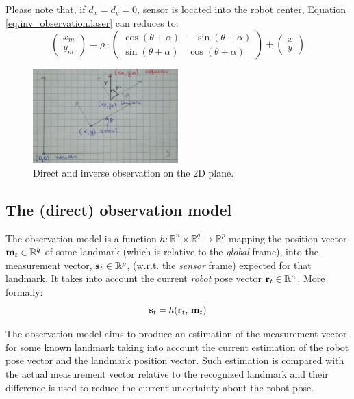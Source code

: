 		Please note that, if $d_x = d_y = 0$, \ie{} sensor is located into the robot center, Equation \ref{eq.inv_observation.laser} can reduces to:
		\[
			\left(\begin{array}{c}
				x_m \\ y_m
			\end{array}\right)
			=
			\rho \cdot
			\left(\begin{array}{ccc}
				\cos{(\theta + \alpha)} & -\sin{(\theta + \alpha)} \\
				\sin{(\theta + \alpha)} & \cos{(\theta + \alpha)}
			\end{array}\right)
			+
			\left(\begin{array}{c}
				x \\ y
			\end{array}\right)
		\]
		
		\begin{figure}
			\centering
			\includegraphics[width=0.5\textwidth]{./img/observation.png}
			\caption{Direct and inverse observation on the 2D plane.}
			\label{fig.observation}
		\end{figure}
		
\subsection{The (direct) observation model}
	The observation model is a function $h : \mathbb{R}^n \times \mathbb{R}^q \rightarrow \mathbb{R}^p$ mapping the position vector $\boldsymbol{\mathrm{{m}}}_t \in \mathbb{R}^q$ of some landmark (which is relative to the \emph{global} frame), into the measurement vector, $\boldsymbol{\mathrm{{s}}}_{t} \in \mathbb{R}^p$, (w.r.t. the \emph{sensor} frame) expected for that landmark. 
	It takes into account the current \emph{robot} pose vector $\boldsymbol{\mathrm{{r}}}_t \in \mathbb{R}^n$.
	More formally:
	\[
		\boldsymbol{\mathrm{{s}}}_t = h(\boldsymbol{\mathrm{{r}}}_{t},\, \boldsymbol{\mathrm{{m}}}_t)
	\]
	
	The observation model aims to produce an estimation of the measurement vector for some known landmark taking into account the current estimation of the robot pose vector and the landmark position vector. 
	Such estimation is compared with the actual measurement vector relative to the recognized landmark and their difference is used to reduce the current uncertainty about the robot pose. 
	
